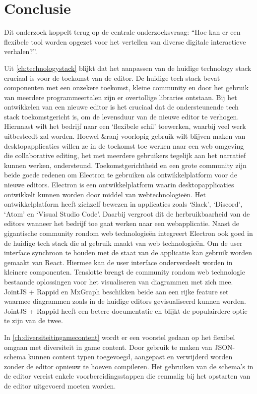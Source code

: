 \chapter{Conclusie}
\label{ch:conclusion}
Dit onderzoek koppelt terug op de centrale onderzoeksvraag: “Hoe kan er een flexibele tool worden opgezet voor het vertellen van diverse digitale interactieve verhalen?”.

Uit \autoref{ch:technologystack} blijkt dat het aanpassen van de huidige technology stack cruciaal is voor de toekomst van de editor. De huidige tech stack bevat componenten met een onzekere toekomst, kleine community en door het gebruik van meerdere programmeertalen zijn er overtollige libraries ontstaan. Bij het ontwikkelen van een nieuwe editor is het cruciaal dat de ondersteunende tech stack toekomstgericht is, om de levensduur van de nieuwe editor te verhogen. Hiernaast wilt het bedrijf naar een ‘flexibele schil’ toewerken, waarbij veel werk uitbesteedt zal worden. Hoewel \&ranj voorlopig gebruik wilt blijven maken van desktopapplicaties willen ze in de toekomst toe werken naar een web omgeving die collaborative editing, het met meerdere gebruikers tegelijk aan het narratief kunnen werken, ondersteund. Toekomstgerichtheid en een grote community zijn beide goede redenen om Electron te gebruiken als ontwikkelplatform voor de nieuwe editors. Electron is een ontwikkelplatform waarin desktopapplicaties ontwikkelt kunnen worden door middel van webtechnologieën. Het ontwikkelplatform heeft zichzelf bewezen in applicaties zoals ‘Slack’, ‘Discord’, ‘Atom’ en ‘Visual Studio Code’. Daarbij vergroot dit de herbruikbaarheid van de editors wanneer het bedrijf toe gaat werken naar een webapplicatie. Naast de gigantische community rondom web technologieën integreert Electron ook goed in de huidige tech stack die al gebruik maakt van web technologieën. Om de user interface synchroon te houden met de staat van de applicatie kan gebruik worden gemaakt van React. Hiermee kan de user interface onderverdeelt worden in kleinere componenten. Tenslotte brengt de community rondom web technologie bestaande oplossingen voor het visualiseren van diagrammen met zich mee. JointJS + Rappid en MxGraph beschikken beide aan een rijke feature set waarmee diagrammen zoals in de huidige editors gevisualiseerd kunnen worden. JointJS + Rappid heeft een betere documentatie en blijkt de populairdere optie te zijn van de twee. 

In \autoref{ch:diversiteitingamecontent} wordt er een voorstel gedaan op het flexibel omgaan met diversiteit in game content. Door gebruik te maken van JSON-schema kunnen content typen toegevoegd, aangepast en verwijderd worden zonder de editor opnieuw te hoeven compileren. Het gebruiken van de schema’s in de editor vereist enkele voorbereidingsstappen die eenmalig bij het opstarten van de editor uitgevoerd moeten worden.

